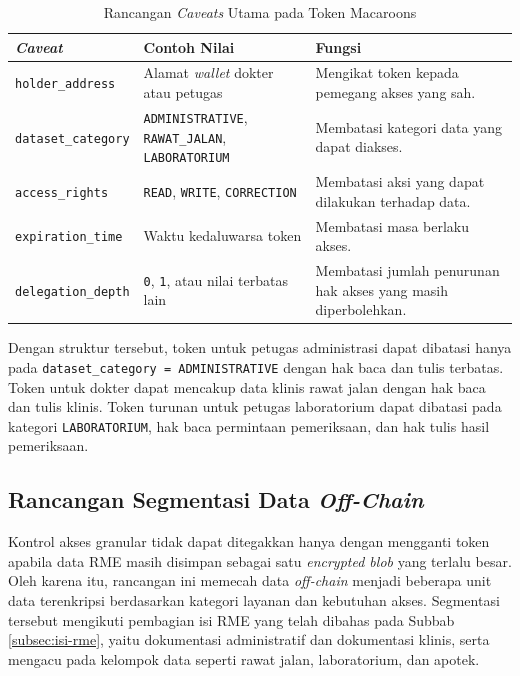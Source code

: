 \begin{table}[!ht]
	\centering
	\caption{Rancangan \textit{Caveats} Utama pada Token Macaroons}
	\label{tab:rancangan-caveats-utama}
	\small
	\begin{tabular}{|p{}|p{}|p{}|}
		\hline
		\textbf{\textit{Caveat}} & \textbf{Contoh Nilai} & \textbf{Fungsi} \\ \hline
		\texttt{holder\_address} & Alamat \textit{wallet} dokter atau petugas & Mengikat token kepada pemegang akses yang sah. \\ \hline
		\texttt{dataset\_category} & \texttt{ADMINISTRATIVE}, \texttt{RAWAT\_JALAN}, \texttt{LABORATORIUM} & Membatasi kategori data yang dapat diakses. \\ \hline
		\texttt{access\_rights} & \texttt{READ}, \texttt{WRITE}, \texttt{CORRECTION} & Membatasi aksi yang dapat dilakukan terhadap data. \\ \hline
		\texttt{expiration\_time} & Waktu kedaluwarsa token & Membatasi masa berlaku akses. \\ \hline
		\texttt{delegation\_depth} & \texttt{0}, \texttt{1}, atau nilai terbatas lain & Membatasi jumlah penurunan hak akses yang masih diperbolehkan. \\ \hline
	\end{tabular}
\end{table}

Dengan struktur tersebut, token untuk petugas administrasi dapat dibatasi hanya pada \texttt{dataset\_category = ADMINISTRATIVE} dengan hak baca dan tulis terbatas. Token untuk dokter dapat mencakup data klinis rawat jalan dengan hak baca dan tulis klinis. Token turunan untuk petugas laboratorium dapat dibatasi pada kategori \texttt{LABORATORIUM}, hak baca permintaan pemeriksaan, dan hak tulis hasil pemeriksaan.

\subsection{Rancangan Segmentasi Data \textit{Off-Chain}}
\label{subsec:rancangan-segmentasi-offchain}

Kontrol akses granular tidak dapat ditegakkan hanya dengan mengganti token apabila data RME masih disimpan sebagai satu \textit{encrypted blob} yang terlalu besar. Oleh karena itu, rancangan ini memecah data \textit{off-chain} menjadi beberapa unit data terenkripsi berdasarkan kategori layanan dan kebutuhan akses. Segmentasi tersebut mengikuti pembagian isi RME yang telah dibahas pada Subbab \ref{subsec:isi-rme}, yaitu dokumentasi administratif dan dokumentasi klinis, serta mengacu pada kelompok data seperti rawat jalan, laboratorium, dan apotek.

